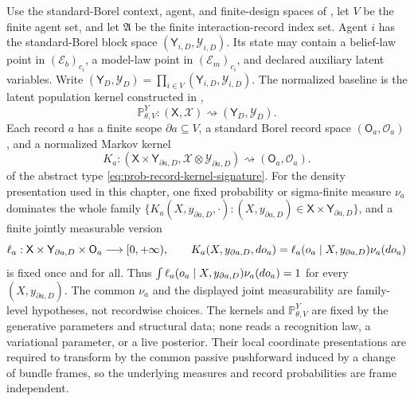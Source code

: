 Use the standard-Borel context, agent, and finite-design spaces of
, let \(V\) be the finite agent
set, and let \(\mathfrak A\) be the finite interaction-record index set.
Agent \(i\) has the standard-Borel block space
\((\mathsf Y_{i,D},\mathscr Y_{i,D})\). Its state may contain a belief-law point in
$(\mathcal E_b)_{c_i}$, a model-law point in $(\mathcal E_m)_{c_i}$, and
declared auxiliary latent variables.  Write
$(\mathsf Y_D,\mathscr Y_D)=
\prod_{i\in V}(\mathsf Y_{i,D},\mathscr Y_{i,D})$. The normalized baseline is
the latent population kernel constructed in ,
\begin{equation}
\mathbb P_{\theta,V}^{Y}:
(\mathsf X,\mathscr X)\rightsquigarrow
(\mathsf Y_D,\mathscr Y_D).
\label{eq:obs-context-baseline-kernel}
\end{equation}
Each record \(a\) has a finite scope
$\partial a\subseteq V$, a standard Borel record space
$(\mathsf O_a,\mathscr O_a)$, and a normalized Markov kernel
\begin{equation}
K_a:(\mathsf X\times\mathsf Y_{\partial a,D},
\mathscr X\otimes\mathscr Y_{\partial a,D})
\rightsquigarrow(\mathsf O_a,\mathscr O_a).
\label{eq:obs-interaction-kernel}
\end{equation}
of the abstract type \eqref{eq:prob-record-kernel-signature}.
For the density presentation used in this chapter, one fixed probability or
sigma-finite measure $\nu_a$ dominates the whole family
$\{K_a(X,y_{\partial a,D},\cdot):(X,y_{\partial a,D})
\in\mathsf X\times\mathsf Y_{\partial a,D}\}$, and a finite jointly measurable
version
\begin{equation}
\ell_a:\mathsf X\times\mathsf Y_{\partial a,D}\times\mathsf O_a
\longrightarrow[0,+\infty),
\qquad
K_a(X,y_{\partial a,D},do_a)
=\ell_a(o_a\mid X,y_{\partial a,D})\nu_a(do_a)
\label{eq:obs-interaction-density}
\end{equation}
is fixed once and for all.  Thus
$\int\ell_a(o_a\mid X,y_{\partial a,D})\nu_a(do_a)=1$ for every
$(X,y_{\partial a,D})$.  The common $\nu_a$ and the displayed joint
measurability are family-level hypotheses, not recordwise choices.
The kernels and \(\mathbb P_{\theta,V}^{Y}\) are fixed by the generative parameters and structural
data; none reads a recognition law, a variational parameter, or a live
posterior.  Their local coordinate presentations are required to transform by
the common passive pushforward induced by a change of bundle frames, so the
underlying measures and record probabilities are frame independent.

